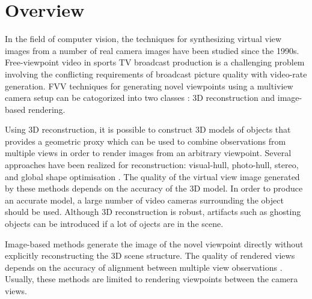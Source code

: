 
\section{Overview}
In the field of computer vision, the techniques for synthesizing virtual view images from a number of real camera
images have been studied since the 1990s.
Free-viewpoint video in sports TV broadcast production is a challenging problem involving the conflicting requirements of 
broadcast picture quality with video-rate generation.
FVV techniques for generating novel viewpoints using a multiview camera setup can be catogorized into two classes 
\cite{05_plane_sweeping}: 3D reconstruction and image-based rendering. 

Using 3D reconstruction, it is possible to construct 3D models of objects that provides a geometric proxy which can be
used to combine observations from multiple views in order to render images from an arbitrary viewpoint. 
Several approaches have been realized for reconstruction: visual-hull, photo-hull, stereo, and 
global shape optimisation \cite{02_iview}.
The quality of the virtual view image generated
by these methods depends on the accuracy of the 3D model. In order to produce an accurate model, a
large number of video cameras surrounding the object should be used. 
Although 3D reconstruction is robust, artifacts such as ghosting objects can be introduced if a lot of ojects are in the scene. 

Image-based methods generate the image of the novel viewpoint directly without explicitly reconstructing the 3D scene structure.
The quality of rendered views depends on the accuracy of alignment between multiple view observations 
\cite{05_plane_sweeping,02_iview}.
Usually, these methods are limited to rendering viewpoints between the camera views.




